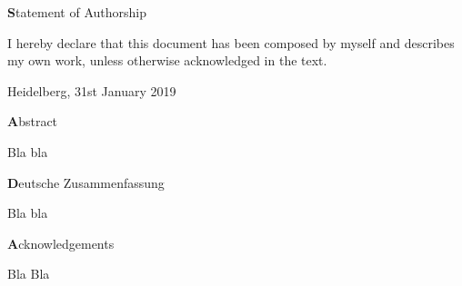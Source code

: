 \documentclass{thesisclass}
\begin{document}
\newsavebox{\saveBoxOne}
\newsavebox{\saveBoxTwo}
\newsavebox{\saveBoxThree}
\newsavebox{\saveBoxFour}
\newsavebox{\saveBoxFive}
\newsavebox{\saveBoxSix}
\newsavebox{\saveBoxSeven}
\newsavebox{\saveBoxEight}


\frontmatter
{}

\blankpage


\thispagestyle{plain}

\vspace*{\fill}

\centerline{\textbf Statement of Authorship}

\vspace{0.25cm}

I hereby declare that this document has been composed by myself and describes my own work, unless otherwise acknowledged in the text.

\vspace{2.5cm}

\hspace{0.25cm} Heidelberg, 31st January 2019

\vspace{2cm}

\blankpage


\thispagestyle{plain}

\begin{addmargin}{0.5cm}

\centerline{\textbf Abstract}


Bla bla

\vskip 2cm

\centerline{\textbf Deutsche Zusammenfassung}


Bla bla

\vskip 2cm

\newpage

\centerline{\textbf Acknowledgements}

Bla Bla

\end{addmargin}

\blankpage
\end{document}
